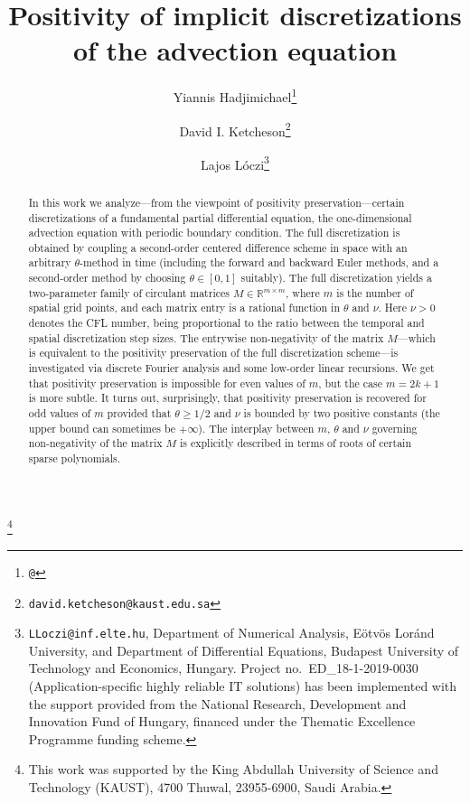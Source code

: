 \documentclass[a4paper]{article}
\title{Positivity of implicit discretizations of the advection equation}
\author{Yiannis Hadjimichael\thanks{\texttt{@} }\and David I. Ketcheson\thanks{\texttt{david.ketcheson@kaust.edu.sa}}\and Lajos L\'oczi\thanks{{\texttt{LLoczi@inf.elte.hu}}, Department of Numerical Analysis, E\"otv\"os Lor\'and University, and Department of Differential Equations, Budapest University of Technology and Economics, Hungary. Project no.~ED\_18-1-2019-0030 (Application-specific highly reliable IT solutions) has been implemented with the support provided from the National Research, Development and Innovation Fund of Hungary, financed under the Thematic Excellence Programme funding scheme.}}
\newcommand{\te}{\theta}
\newcommand\blfootnote[1]{%
  \begingroup
  \renewcommand\thefootnote{}\footnote{#1}%
  \addtocounter{footnote}{-1}%
  \endgroup
}
\begin{document}
\maketitle
\begin{abstract}
In this work we analyze---from the viewpoint of positivity
preservation---certain discretizations of a fundamental partial differential
equation, the one-dimensional advection equation with periodic boundary
condition. The full discretization is obtained by coupling a second-order
centered difference scheme in space with an arbitrary $\te$-method in time
(including the forward and backward Euler methods, and a second-order method by
choosing $\te\in [0,1]$ suitably). The full discretization yields a
two-parameter family of circulant matrices $M\in\mathbb{R}^{m\times m}$, 
where $m$ is the number of spatial grid points, and each matrix entry is a
rational function in $\te$ and $\nu$. Here $\nu>0$ denotes the CFL number,
being proportional to the ratio between the temporal and spatial discretization
step sizes. The entrywise non-negativity of the matrix $M$---which is
equivalent to the positivity preservation of the full discretization
scheme---is investigated via discrete Fourier analysis and some low-order
linear recursions. We get that positivity preservation is impossible for even
values of $m$, but the case $m=2k+1$ is more subtle. It turns out,
surprisingly, that positivity preservation is recovered for odd values of $m$
provided that $\te\ge 1/2$ and $\nu$ is bounded by two positive constants (the
upper bound can sometimes be $+\infty$). The interplay between $m$, $\te$ and
$\nu$ governing non-negativity of the matrix $M$ is explicitly described in
terms of roots of certain sparse polynomials. %
\end{abstract}
\blfootnote{This work was supported by the King Abdullah University of Science and Technology (KAUST), 4700
Thuwal, 23955-6900, Saudi Arabia.}
\end{document}
